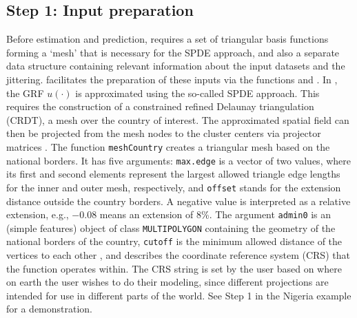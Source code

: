 \subsection{Step 1: Input preparation \label{sec:InputPreparation}}
Before estimation and prediction,  requires a set of triangular basis functions forming a `mesh' that is necessary for the SPDE approach, and also a separate data structure containing relevant information about the input datasets and the jittering.  facilitates the preparation of these inputs via the functions  and .
In , the GRF $u(\cdot)$ is approximated using the so-called SPDE approach. This requires the construction of a constrained refined Delaunay triangulation (CRDT), a mesh over the country of interest. The approximated spatial field can then be projected from the mesh nodes to the cluster centers via projector matrices \citep{Lindgren:etal:11}. The function \texttt{meshCountry}  creates a triangular mesh based on the national borders.
It has five arguments: \texttt{max.edge} is a vector of two values, where its first and second elements represent the largest allowed triangle edge lengths for the inner and outer mesh, respectively, and \texttt{offset} stands for the extension distance outside the country borders. A negative value is interpreted as a relative extension, e.g., $-0.08$ means an extension of 8\%. The argument \texttt{admin0} is an  (simple features) object of class \texttt{MULTIPOLYGON} containing the geometry of the national borders of the country, \texttt{cutoff} is the minimum allowed distance of the vertices to each other \citep{fmesherPackage}, and  describes the coordinate reference system (CRS) that the function operates within. The CRS string is set by the user based on where on earth the user wishes to do their modeling, since different projections are intended for use in different parts of the world.
See Step 1 in the Nigeria example for a demonstration.


